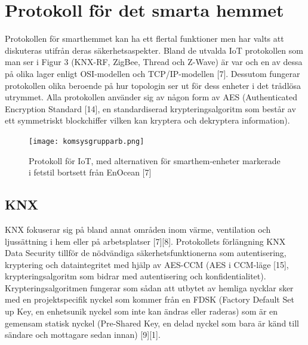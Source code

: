 \documentclass[conference]{IEEEtran}
\begin{document}
\section{Protokoll för det smarta hemmet}

Protokollen för smarthemmet kan ha ett flertal funktioner men har valts att diskuteras utifrån deras säkerhetsaspekter. Bland de utvalda IoT protokollen som man ser i Figur 3 (KNX-RF, ZigBee, Thread och Z-Wave) är var och en av dessa på olika lager enligt OSI-modellen och TCP/IP-modellen [7]. Dessutom fungerar protokollen olika beroende på hur topologin ser ut för dess enheter i det trådlösa utrymmet. Alla protokollen använder sig av någon form av AES (Authenticated Encryption Standard [14], en standardiserad krypteringsalgoritm som består av ett symmetriskt blockchiffer vilken kan kryptera och dekryptera information). 


\begin{figure}[htp]
    \centering
    \texttt{[image: komsysgrupparb.png]}
    \caption{Protokoll för IoT, med alternativen för smarthem-enheter markerade i fetstil bortsett från EnOcean [7]}
    \label{fig:bild}
\end{figure}

\subsection{KNX}
KNX fokuserar sig på bland annat områden inom värme, ventilation och ljussättning i hem eller på arbetsplatser [7][8]. Protokollets förlängning KNX Data Security tillför de nödvändiga säkerhetsfunktionerna som autentisering, kryptering och dataintegritet med hjälp av AES-CCM (AES i CCM-läge [15], krypteringsalgoritm som bidrar med autentisering och konfidentialitet). Krypteringsalgoritmen fungerar som sådan att utbytet av hemliga nycklar sker med en projektspecifik nyckel som kommer från en FDSK (Factory Default Set up Key, en enhetsunik nyckel som inte kan ändras eller raderas) som är en gemensam statisk nyckel (Pre-Shared Key, en delad nyckel som bara är känd till sändare och mottagare sedan innan) [9][1].
\end{document}
